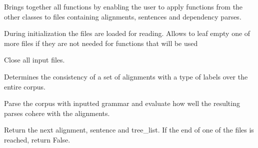 \documentclass[letterpaper,10pt,english]{sphinxmanual}
\begin{document}
\begin{fulllineitems}
\label{file_processing:file_processing.ProcessFiles}
Brings together all functions by enabling the user
to apply functions from the other classes to files
containing alignments, sentences and
dependency parses.

During initialization the files are loaded for reading. Allows to leaf empty
one of more files if they are not needed for functions that will be used

\begin{fulllineitems}
\label{file_processing:file_processing.ProcessFiles.close_all}
Close all input files.

\end{fulllineitems}


\begin{fulllineitems}
\label{file_processing:file_processing.ProcessFiles.consistent_labels}
Determines the consistency of a set of alignments with a type of labels
over the entire corpus.

\end{fulllineitems}


\begin{fulllineitems}
\label{file_processing:file_processing.ProcessFiles.evaluate_grammar}
Parse the corpus with inputted grammar and evaluate
how well the resulting parses cohere with the
alignments.

\end{fulllineitems}


\begin{fulllineitems}
\label{file_processing:file_processing.ProcessFiles.next}
Return the next alignment, sentence and tree\_list.
If the end of one of the files is reached, return False.


\end{fulllineitems}
\end{fulllineitems}
\end{document}
